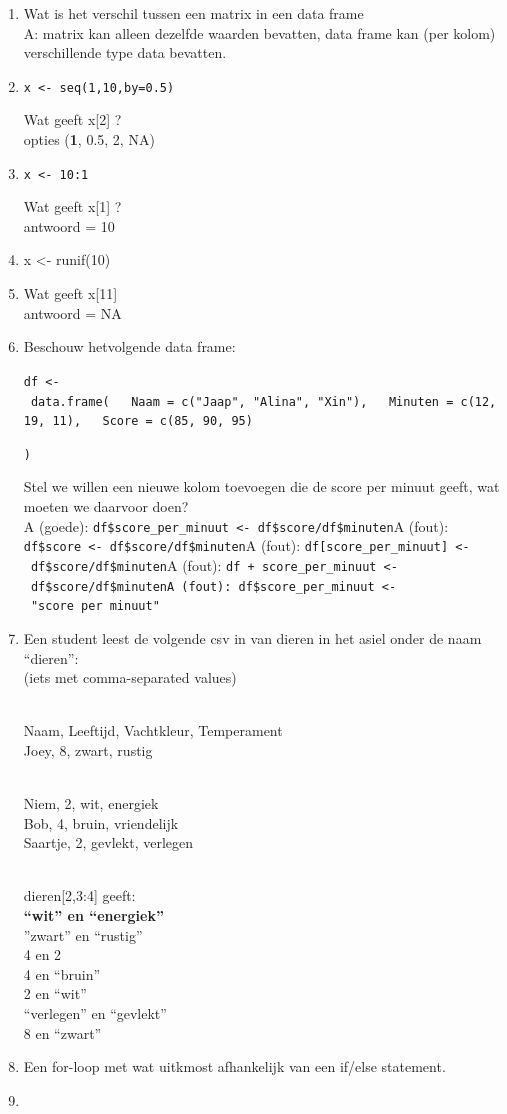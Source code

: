 \documentclass[
  b5paper,
  DIV=11,
  numbers=noendperiod]{scrreprt}
\theoremstyle{definition}
\theoremstyle{remark}
\begin{document}
\begin{enumerate}
\def\labelenumi{\arabic{enumi}.}
\item
  Wat is het verschil tussen een matrix in een data frame\\
  A: matrix kan alleen dezelfde waarden bevatten, data frame kan (per
  kolom) verschillende type data bevatten.
\item
  \texttt{x\ \textless{}-\ seq(1,10,by=0.5)}

  Wat geeft x{[}2{]} ?\\
  opties (\textbf{1}, 0.5, 2, NA)
\item
  \texttt{x\ \textless{}-\ 10:1}

  Wat geeft x{[}1{]} ?\\
  antwoord = 10
\item
  x \textless- runif(10)
\item
  Wat geeft x{[}11{]}\\
  antwoord = NA
\item
  Beschouw hetvolgende data frame:

  \texttt{df\ \textless{}-\ data.frame(\ \ \ Naam\ =\ c("Jaap",\ "Alina",\ "Xin"),\ \ \ Minuten\ =\ c(12,\ 19,\ 11),\ \ \ Score\ =\ c(85,\ 90,\ 95)}

  \texttt{)}

  Stel we willen een nieuwe kolom toevoegen die de score per minuut
  geeft, wat moeten we daarvoor doen?\\
  A (goede):
  \texttt{df\$score\_per\_minuut\ \textless{}-\ df\$score/df\$minuten}A
  (fout): \texttt{df\$score\ \textless{}-\ df\$score/df\$minuten}A
  (fout):
  \texttt{df{[}score\_per\_minuut{]}\ \textless{}-\ df\$score/df\$minuten}A
  (fout):
  \texttt{df\ +\ score\_per\_minuut\ \textless{}-\ df\$score/df\$minutenA\ (fout):\ df\$score\_per\_minuut\ \textless{}-\ "score\ per\ minuut"}
\item
  Een student leest de volgende csv in van dieren in het asiel onder de
  naam ``dieren'':\\
  (iets met comma-separated values)\\
  \strut \\
  Naam, Leeftijd, Vachtkleur, Temperament\\
  Joey, 8, zwart, rustig\\
  \strut \\
  Niem, 2, wit, energiek\\
  Bob, 4, bruin, vriendelijk\\
  Saartje, 2, gevlekt, verlegen\\
  \strut \\
  dieren{[}2,3:4{]} geeft:\\
  \textbf{``wit'' en ``energiek''\\
  }''zwart'' en ``rustig''\\
  4 en 2\\
  4 en ``bruin''\\
  2 en ``wit''\\
  ``verlegen'' en ``gevlekt''\\
  8 en ``zwart''
\item
  Een for-loop met wat uitkmost afhankelijk van een if/else statement.
\item
\end{enumerate}
\end{document}
